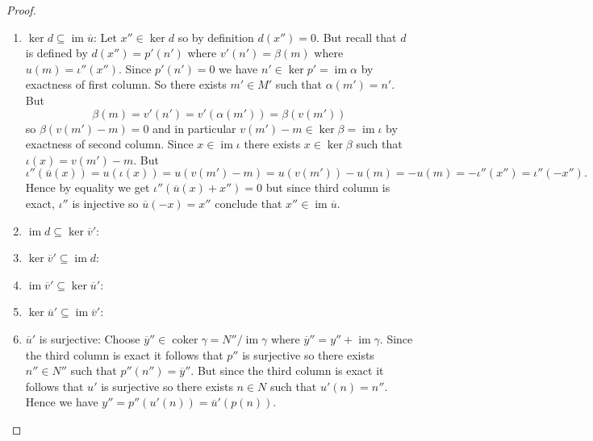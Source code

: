 \documentclass[8pt]{amsart}
\theoremstyle{plain}%
\theoremstyle{definition}
\theoremstyle{remark}
\numberwithin{equation}{section}
\newcommand{\im}{\operatorname{im}}
\newcommand{\coker}{\operatorname{coker}}
\begin{document}
\begin{proof}
\begin{enumerate}
		\item $\boxed{\ker d \subseteq \im \overline u}$: Let $x'' \in \ker d$ so by definition $d(x'') = 0$. But recall that $d$ is defined by $d(x'') = p'(n')$ where $v'(n') = \beta(m)$ where $u(m) = \iota''(x'')$. Since $p'(n') = 0$ we have $n' \in \ker p' = \im \alpha$ by exactness of first column. So there exists $m' \in M'$ such that $\alpha(m') = n'$. But $$ \beta(m) = v'(n') = v'(\alpha(m')) = \beta(v(m'))$$ so $\beta(v(m') - m) = 0$ and in particular $v(m') - m \in \ker \beta = \im \iota$ by exactness of second column. Since $x \in \im \iota$ there exists $x \in \ker \beta$ such that $\iota(x) = v(m') - m$. But $$\iota''(\overline u(x)) = u(\iota(x)) = u(v(m') - m) = u(v(m')) - u(m) = -u(m) = -\iota''(x'') = \iota''(-x'').$$ Hence by equality we get $\iota''(\overline u(x) + x'') = 0$ but since third column is exact, $\iota''$ is injective so $\overline u(-x) = x''$ conclude that $x'' \in \im \overline u$.
		\item $\im d \subseteq \ker \overline v'$:
		\item $\ker \overline v' \subseteq \im d$:
		\item $\im \overline v' \subseteq \ker \overline u'$:
		\item $\ker \overline u' \subseteq \im \overline v'$:

		\item $\overline u'$ is surjective: Choose $\overline y'' \in \coker \gamma = N''/\im \gamma$ where $\overline y'' = y'' + \im \gamma$. Since the third column is exact it follows that $p''$ is surjective so there exists $n'' \in N''$ such that $p''(n'') = \overline y''$. But since the third column is exact it follows that $u'$ is surjective so there exists $n \in N$ such that $u'(n) = n''$. Hence we have $y'' = p''(u'(n)) = \overline u'(p(n))$.
	\end{enumerate}


	\end{proof}
\end{document}
